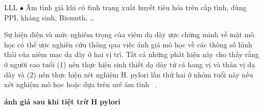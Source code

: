 \documentclass[9pt,twocolumn]{article}
\begin{document}
\begin{table}
{\begin{tabulary}{\linewidth}{LLL}
   \ensuremath{\bullet}  \^{A}m t\'{\i}nh giả khi c{\'{o}} t\`{\i}nh tr{\d{a}}ng xuất huy{{\'{\^{e}}}}t ti{\^{e}}u h{\'{o}}a tr{\^{e}}n cấp t\'{\i}nh, d\`{u}ng PPI, kh\'{a}ng sinh, Bismuth, {\ldots}\\
\hline 
\end{tabulary}\par 
}
\end{table}
Sự hi{\^{\d{e}}}n di{\^{\d{e}}}n v\`{a} mức  nghi{\^{e}}m tr\d{o}ng của vi{\^{e}}m d{\d{a}} d\`{a}y  \text{\dj}ược chứng minh về mặt m{\^o} h\d{o}c c{\'{o}} thể \text{\dj}ược nghi{\^{e}}n cứu th{\^o}ng qua vi{\^{\d{e}}}c \text{\dj}\'{a}nh gi\'{a} m{\^o} h\d{o}c về c\'{a}c th{\^o}ng số h\`{\i}nh th\'{a}i của ni{\^{e}}m m{\d{a}}c d{\d{a}} d\`{a}y ở hai v\d{i} tr\'{\i}. Tất cả những ph\'{a}t hi{\^{\d{e}}}n n\`{a}y cho thấy rằng ở người cao tuổi (1) n{\^{e}}n thực hi{\^{\d{e}}}n sinh thi{{\'{\^{e}}}}t d{\d{a}} d\`{a}y từ cả hang v\d{i} v\`{a} th\^{a}n v\d{i} d{\d{a}} d\`{a}y v\`{a} (2) n{\^{e}}n thực hi{\^{\d{e}}}n x{\'e}t nghi{\^{\d{e}}}m H. pylori lần thứ hai ở nh{\'{o}}m tuổi n\`{a}y n{{\'{\^{e}}}}u x{\'e}t nghi{\^{\d{e}}}m m{\^o} h\d{o}c hoặc dựa tr{\^{e}}n ur{\^{e}} \^{a}m t\'{\i}nh\unskip~\cite{2901310:34531806} .

\textbf{\text{\DJ}\'{a}nh gi\'{a} sau khi ti{\^{\d{e}}}t trừ H} \textbf{pylori}
\end{document}
